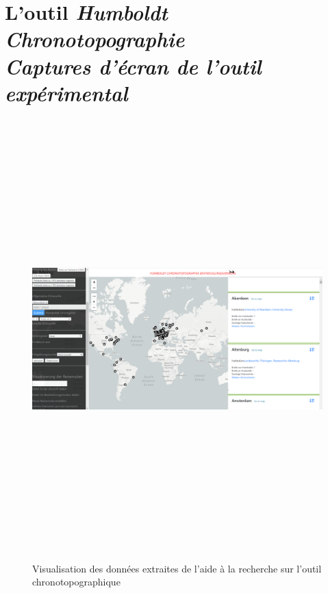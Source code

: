 \documentclass[a4paper, 12pt, twoside]{book}
\newcommand\ChapterSub[2]{
  \chapter[#1: {\itshape#2}]{#1\\[2ex]\Large\itshape#2}}
\begin{document}
\ChapterSub{L'outil \textit{Humboldt Chronotopographie}}{Captures d'écran de l'outil expérimental}
\begin{figure}[h!]
    \centering
    \caption{Visualisation des données extraites de l'aide à la recherche sur l'outil chronotopographique}
    \label{fig:chronoFindbuch}
    \includegraphics[angle=90,origin=c, height=17cm]{img/chronotopographie/chronoto_findbuch.png}
    \hfill
\end{figure}
\end{document}
